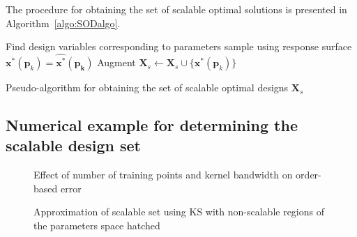The procedure for obtaining the set of scalable optimal solutions is presented in Algorithm~\ref{algo:SODalgo}.

\begin{algorithm}
	\DontPrintSemicolon %
	 {

		 {
			Find design variables corresponding to parameters sample using response surface $\mathbf{x}^*(\mathbf{p}_k) = \hat{\mathbf{x}^*}(\mathbf{p_k})$\;
			Augment $\mathbf{X}_s \gets \mathbf{X}_s \cup \{ \mathbf{x}^*(\mathbf{p}_k) \} $\;
		}
	}
	\caption{Pseudo-algorithm for obtaining the set of scalable optimal designs $\mathbf{X}_s$}
	\label{algo:SODalgo}
\end{algorithm}

\subsection{Numerical example for determining the scalable design set} \label{subsec:numex}

\begin{figure*}[h!]
	\centering
	 \hspace{0.07\textwidth}%
	\caption{Effect of number of training points and kernel bandwidth on order-based error}
	\label{fig:HPeffect}
\end{figure*}

\begin{figure*}[h!]
	\centering
	 \hspace{0.07\textwidth}%
	\caption{Approximation of scalable set using \ac{KS} with non-scalable regions of the parameters space hatched}
	\label{fig:testfun}
\end{figure*}

